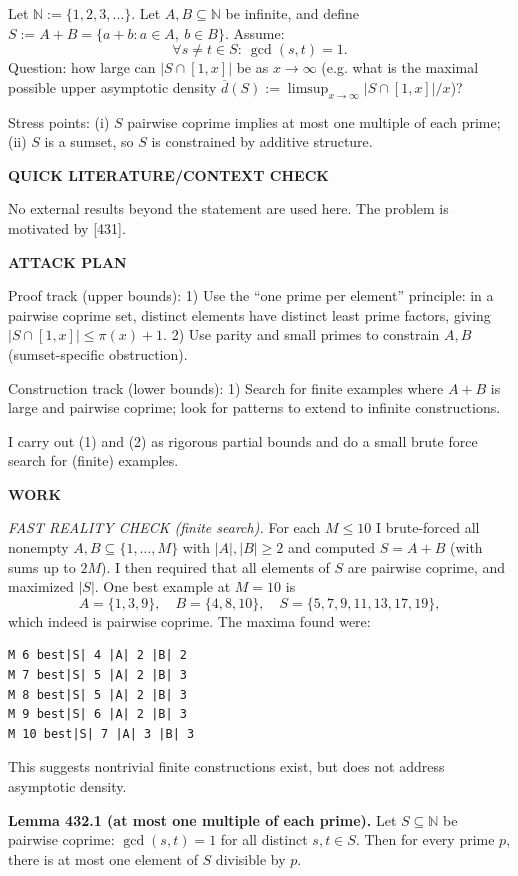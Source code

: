 Let $\mathbb N:=\{1,2,3,\dots\}$. Let $A,B\subseteq\mathbb N$ be infinite, and define $S:=A+B=\{a+b:a\in A,\ b\in B\}$. Assume:
\[
\forall s\ne t\in S:\ \gcd(s,t)=1.
\]
Question: how large can $|S\cap[1,x]|$ be as $x\to\infty$ (e.g. what is the maximal possible upper asymptotic density $\overline d(S):=\limsup_{x\to\infty}|S\cap[1,x]|/x$)?

Stress points: (i) $S$ pairwise coprime implies at most one multiple of each prime; (ii) $S$ is a sumset, so $S$ is constrained by additive structure.

\medskip
\noindent\textbf{QUICK LITERATURE/CONTEXT CHECK}

No external results beyond the statement are used here. The problem is motivated by [431].

\medskip
\noindent\textbf{ATTACK PLAN}

Proof track (upper bounds):
1) Use the ``one prime per element'' principle: in a pairwise coprime set, distinct elements have distinct least prime factors, giving $|S\cap[1,x]|\le \pi(x)+1$.
2) Use parity and small primes to constrain $A,B$ (sumset-specific obstruction).

Construction track (lower bounds):
1) Search for finite examples where $A+B$ is large and pairwise coprime; look for patterns to extend to infinite constructions.

I carry out (1) and (2) as rigorous partial bounds and do a small brute force search for (finite) examples.

\medskip
\noindent\textbf{WORK}

\noindent\emph{FAST REALITY CHECK (finite search).}
For each $M\le 10$ I brute-forced all nonempty $A,B\subseteq\{1,\dots,M\}$ with $|A|,|B|\ge 2$ and computed $S=A+B$ (with sums up to $2M$). I then required that all elements of $S$ are pairwise coprime, and maximized $|S|$.
One best example at $M=10$ is
\[A=\{1,3,9\},\quad B=\{4,8,10\},\quad S=\{5,7,9,11,13,17,19\},\]
which indeed is pairwise coprime.
The maxima found were:
\begin{verbatim}
M 6 best|S| 4 |A| 2 |B| 2
M 7 best|S| 5 |A| 2 |B| 3
M 8 best|S| 5 |A| 2 |B| 3
M 9 best|S| 6 |A| 2 |B| 3
M 10 best|S| 7 |A| 3 |B| 3
\end{verbatim}
This suggests nontrivial finite constructions exist, but does not address asymptotic density.

\medskip
\noindent\textbf{Lemma 432.1 (at most one multiple of each prime).}
Let $S\subseteq\mathbb N$ be pairwise coprime: $\gcd(s,t)=1$ for all distinct $s,t\in S$. Then for every prime $p$, there is at most one element of $S$ divisible by $p$.

